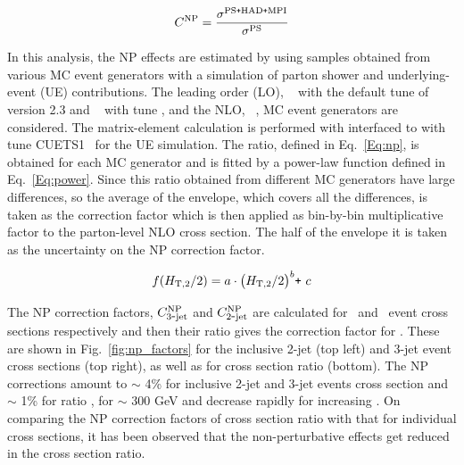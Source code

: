 \begin{equation}
  \label{Eq:np}
  C^{\rm NP} = \frac{\sigma^{\rm PS \plusn HAD \plusn MPI}}{\sigma^{\rm PS}}
\end{equation}

In this analysis, the NP effects are estimated by using samples obtained from various MC event generators with a simulation of parton shower and underlying-event (UE) contributions. The leading order (LO), \HERWIGPP~\cite{Bahr:2008pv} with the default tune of version 2.3 and \PYTHIAS~\cite{Sjostrand:2006za} with tune \Ztwostar, and the NLO, \POWHEG~\cite{Nason:2004rx,Frixione:2007vw,Alioli:2010xa}, MC event generators are considered. The matrix-element calculation is performed with \POWHEG interfaced to \PYTHIAE with tune CUETS1~\cite{Khachatryan:2015pea} for the UE simulation. The ratio, defined in Eq.~\ref{Eq:np}, is obtained for each MC generator and is fitted by a power-law function defined in Eq.~\ref{Eq:power}. Since this ratio obtained from different MC generators have large differences, so the average of the envelope, which covers all the differences, is taken as the correction factor which is then applied as bin-by-bin multiplicative factor to the parton-level NLO cross section. The half of the envelope it is taken as the uncertainty on the NP correction factor. 

\begin{equation}
  \label{Eq:power}
  f(H_{\mathrm{T,2}}/2) = a\cdot\big(H_{\mathrm{T,2}}/2\big)^{b}\texttt{+}~c
\end{equation}

The NP correction factors, $C_{\rm 3\mbox{-} jet}^{\rm NP}$ and $C_{\rm 2\mbox{-} jet}^{\rm NP}$ are calculated for \njt~and \njth~event cross sections respectively and then their ratio gives the correction factor for \ratio . These are shown in Fig.~\ref{fig:np_factors} for the inclusive 2-jet (top left) and 3-jet event cross sections (top right), as well as for cross section ratio \ratio (bottom). The NP corrections amount to $\sim$ 4\% for inclusive 2-jet and 3-jet events cross section and $\sim$ 1\% for ratio \ratio, for \httwo $\sim$ 300 GeV and decrease rapidly for increasing \httwo. On comparing the NP correction factors of cross section ratio with that for individual cross sections, it has been observed that the non-perturbative effects get reduced in the cross section ratio.

